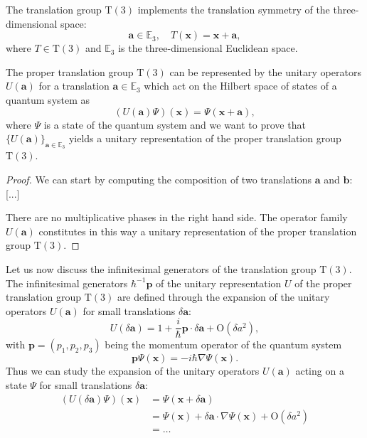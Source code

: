 \begin{example}
    The translation group \(\mathrm{T}(3)\) implements the translation symmetry of the three-dimensional space:
    \[
        \mathbf{a} \in \mathbb{E}_3, \quad T(\mathbf{x}) = \mathbf{x} + \mathbf{a},
    \]
    where \(T \in \mathrm{T}(3)\) and \(\mathbb{E}_3\) is the three-dimensional Euclidean space.

    The proper translation group \(\mathrm{T}(3)\) can be represented by the unitary operators \(U(\mathbf{a})\) for a translation \(\mathbf{a} \in \mathbb{E}_3\) which act on the Hilbert space of states of a quantum system as
    \[
        (U(\mathbf{a})\Psi)(\mathbf{x}) = \Psi(\mathbf{x} + \mathbf{a}),
    \]
    where \(\Psi\) is a state of the quantum system and we want to prove that \(\{U(\mathbf{a})\}_{\mathbf{a} \in \mathbb{E}_3}\) yields a unitary representation of the proper translation group \(\mathrm{T}(3)\).
    \begin{proof}
        We can start by computing the composition of two translations \(\mathbf{a}\) and \(\mathbf{b}\):
        [...]

        There are no multiplicative phases in the right hand side. The operator family \(U(\mathbf{a})\) constitutes in this way a unitary representation of the proper translation group \(\mathrm{T}(3)\).
    \end{proof}
    Let us now discuss the infinitesimal generators of the translation group \(\mathrm{T}(3)\). The infinitesimal generators \(\hbar^{-1}\mathbf{p}\) of the unitary representation \(U\) of the proper translation group \(\mathrm{T}(3)\) are defined through the expansion of the unitary operators \(U(\mathbf{a})\) for small translations \(\delta\mathbf{a}\):
    \[
        U(\delta\mathbf{a}) = 1 + \frac{i}{\hbar} \mathbf{p} \cdot \delta\mathbf{a} + \mathrm{O}(\delta a^2),
    \]
    with \(\mathbf{p} = (p_1, p_2, p_3)\) being the momentum operator of the quantum system
    \[
        \mathbf{p} \Psi(\mathbf{x}) = -i \hbar \nabla \Psi(\mathbf{x}).
    \]
    Thus we can study the expansion of the unitary operators \(U(\mathbf{a})\) acting on a state \(\Psi\) for small translations \(\delta\mathbf{a}\):
    \[
        \begin{aligned}
            (U(\delta\mathbf{a})\Psi)(\mathbf{x}) & = \Psi(\mathbf{x} + \delta\mathbf{a})                                                         \\
                                                  & = \Psi(\mathbf{x}) + \delta \mathbf{a} \cdot \nabla \Psi(\mathbf{x}) + \mathrm{O}(\delta a^2) \\
                                                  & = \dots
        \end{aligned}
    \]


\end{example}
